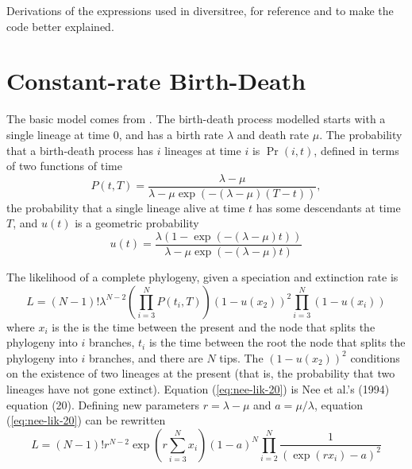 \documentclass[12pt]{article}
\newcommand{\diversitree}{\textsf{diversitree}}
\begin{document}
Derivations of the expressions used in \diversitree, for reference and
to make the code better explained.

\section{Constant-rate Birth-Death}
The basic model comes from  \citet{Nee-1994-305}.  
%
The birth-death process modelled starts with a single lineage at time
$0$, and has a birth rate $\lambda$ and death rate $\mu$.
%
The probability that a birth-death process has $i$ lineages at time
$i$ is $\Pr(i,t)$, defined in terms of two functions of time
\begin{equation}
  \label{eq:nee-p-descendants}
  P(t, T) = \frac{\lambda - \mu}{
    \lambda - \mu \exp(-(\lambda - \mu)(T-t))},
\end{equation}
the probability that a single lineage alive at time $t$ has some
descendants at time $T$, and $u(t)$ is a geometric probability
\begin{equation}
  \label{eq:nee-u}
  u(t) = \frac{\lambda (1 - \exp(-(\lambda - \mu)t))}{
    \lambda - \mu \exp(-(\lambda - \mu)t)}
\end{equation}


The likelihood of a complete phylogeny, given a speciation and
extinction rate is
\begin{equation}
  \label{eq:nee-lik-20}
  L = (N-1)!\lambda^{N-2}
  \left(\prod_{i=3}^NP(t_i, T)\right)
  (1 - u(x_2))^2
  \prod_{i=3}^N(1-u(x_i))
\end{equation}
where $x_i$ is the is the time between the present and the node that
splits the phylogeny into $i$ branches, $t_i$ is the time between the
root the node that splits the phylogeny into $i$ branches, and there
are $N$ tips.
%
The $(1 - u(x_2))^2$ conditions on the existence of two lineages at
the present (that is, the probability that two lineages have not gone
extinct).
%
Equation (\ref{eq:nee-lik-20}) is Nee et al.'s (1994) equation (20).
%
Defining new parameters $r = \lambda - \mu$ and $a = \mu/\lambda$,
equation (\ref{eq:nee-lik-20}) can be rewritten
\begin{equation}
  \label{eq:nee-lik-21}
  L = 
  (N-1)!r^{N-2}\exp\left(r\sum_{i=3}^Nx_i\right)(1-a)^N
  \prod_{i=2}^N\frac{1}{(\exp(r x_i) - a)^2}
\end{equation}
\end{document}
